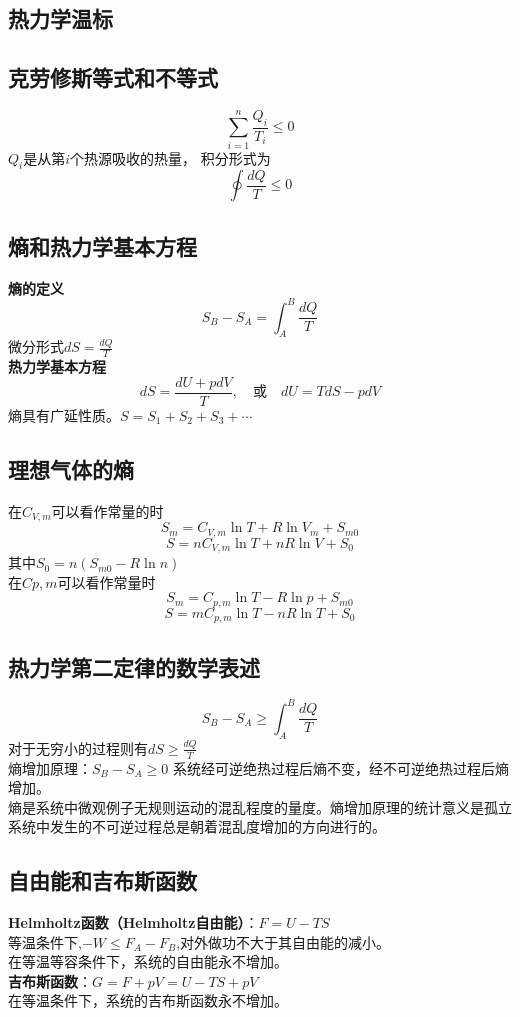 \documentclass[12pt,a4paper]{article}
\begin{document}
\subsection{热力学温标}

\subsection{克劳修斯等式和不等式}
\[
\sum_{i=1}^n\frac{Q_i}{T_i}\le0
\]
\(Q_i\)是从第\(i\)个热源吸收的热量，
积分形式为
\[
\oint\frac{dQ}{T}\le0
\]

\subsection{熵和热力学基本方程}
\textbf{熵的定义}
\[
S_B-S_A=\int_A^B\frac{dQ}{T}
\]
微分形式\quad\(dS=\frac{dQ}{T}\)\\
\textbf{热力学基本方程}
\[
dS=\frac{dU+pdV}{T},\quad 或\quad dU=TdS-pdV
\]
熵具有广延性质。\(S=S_1+S_2+S_3+\cdots\)
\subsection{理想气体的熵}
在\(C_{V,m}\)可以看作常量的时
\[
S_m=C_{V,m}\ln T+R\ln V_m+S_{m0}
\]
\[
S=nC_{V,m}\ln T+nR\ln V+S_0
\]
其中\(S_0=n(S_{m0}-R\ln n)\)\\
在\(C{p,m}\)可以看作常量时
\[
S_m=C_{p,m}\ln T-R\ln p+S_{m0}
\]
\[
S=mC_{p,m}\ln T-nR\ln T+S_0
\]
\subsection{热力学第二定律的数学表述}
\[
S_B-S_A\ge\int_A^B\frac{dQ}{T}
\]
对于无穷小的过程则有\(dS\ge\frac{dQ}{T}\)\\
熵增加原理：\(S_B-S_A\ge0\) \quad 系统经可逆绝热过程后熵不变，经不可逆绝热过程后熵增加。\\
熵是系统中微观例子无规则运动的混乱程度的量度。熵增加原理的统计意义是孤立系统中发生的不可逆过程总是朝着混乱度增加的方向进行的。
\subsection{自由能和吉布斯函数}
\textbf{Helmholtz函数（Helmholtz自由能）}：\(F=U-TS\)\\
等温条件下,\(-W\le F_A-F_B\),对外做功不大于其自由能的减小。\\
在等温等容条件下，系统的自由能永不增加。\\
\textbf{吉布斯函数}：\(G=F+pV=U-TS+pV\)\\
在等温条件下，系统的吉布斯函数永不增加。
\end{document}
